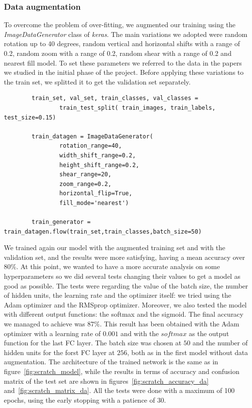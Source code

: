 \documentclass[11pt,a4paper,oneside]{article}
\begin{document}
\subsubsection{Data augmentation}
To overcome the problem of over-fitting, we augmented our training using the \textit{ImageDataGenerator} class of \textit{keras}. The main variations we adopted were random rotation up to 40 degrees, random vertical and horizontal shifts with a range of 0.2, random zoom with a range of 0.2, random shear with a range of 0.2 and nearest fill model. To set these parameters we referred to the data in the papers we studied in the initial phase of the project. Before applying these variations to the train set, we splitted it to get the validation set separately.

\begin{verbatim}
        train_set, val_set, train_classes, val_classes = 
                train_test_split( train_images, train_labels, test_size=0.15)
        
        train_datagen = ImageDataGenerator(
                rotation_range=40,
                width_shift_range=0.2,
                height_shift_range=0.2,
                shear_range=20,
                zoom_range=0.2,
                horizontal_flip=True,
                fill_mode='nearest')

        train_generator = train_datagen.flow(train_set,train_classes,batch_size=50)
\end{verbatim}

We trained again our model with the augmented training set and with the validation set, and the results were more satisfying, having a mean accuracy over $80\%$. At this point, we wanted to have a more accurate analysis on some hyperparameters so we did several tests changing their values to get a model as good as possible. 
The tests were regarding the value of the batch size, the number of hidden units, the learning rate and the optimizer itself: we tried using the Adam optimizer and the RMSprop optimizer. Moreover, we also tested the model with different output functions: the softmax and the sigmoid. 
The final accuracy we managed to achieve was $87\%$. This result has been obtained with the Adam optimizer with a learning rate of $0.001$ and with the $softmax$ as the output function for the last FC layer. The batch size was chosen at $50$ and the number of hidden units for the forst FC layer at $256$, both as in the first model without data augmentation. The architecture of the trained network is the same as in figure~\ref{fig:scratch_model}, while the results in terms of accuracy and confusion matrix of the test set are shown in figures~\ref{fig:scratch_accuracy_da} and~\ref{fig:scratch_matrix_da}.
All the tests were done with a maximum of 100 epochs, using the early stopping with a patience of 30.
\end{document}
